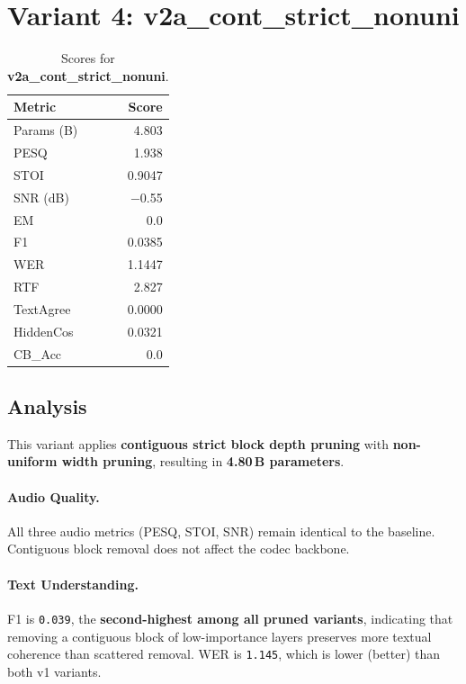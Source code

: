 \documentclass[11pt,a4paper]{article}
\newcommand{\scoreval}[1]{\texttt{#1}}
\begin{document}
\section{Variant 4: v2a\_cont\_strict\_nonuni}

\begin{table}[H]
\centering
\caption{Scores for \textbf{v2a\_cont\_strict\_nonuni}.}
\begin{tabular}{l r}
\toprule
\textbf{Metric} & \textbf{Score} \\
\midrule
Params (B)    & 4.803 \\
PESQ          & 1.938 \\
STOI          & 0.9047 \\
SNR (dB)      & $-$0.55 \\
EM            & 0.0 \\
F1            & 0.0385 \\
WER           & 1.1447 \\
RTF           & 2.827 \\
TextAgree     & 0.0000 \\
HiddenCos     & 0.0321 \\
CB\_Acc       & 0.0 \\
\bottomrule
\end{tabular}
\end{table}

\subsection{Analysis}

This variant applies \textbf{contiguous strict block depth pruning} with \textbf{non-uniform width pruning}, resulting in \textbf{4.80\,B parameters}.

\paragraph{Audio Quality.}
All three audio metrics (PESQ, STOI, SNR) remain identical to the baseline. Contiguous block removal does not affect the codec backbone.

\paragraph{Text Understanding.}
F1 is \scoreval{0.039}, the \textbf{second-highest among all pruned variants}, indicating that removing a contiguous block of low-importance layers preserves more textual coherence than scattered removal. WER is \scoreval{1.145}, which is lower (better) than both v1 variants.
\end{document}
